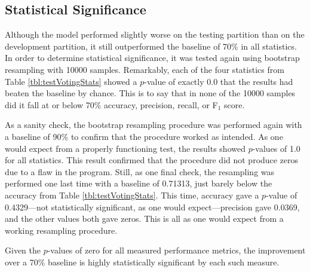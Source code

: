 \documentclass{article}
\begin{document}
\subsection*{Statistical Significance}

Although the model performed slightly worse on the testing partition than on the development partition, it still outperformed the baseline of 70\% in all statistics. In order to determine statistical significance, it was tested again using bootstrap resampling with 10000 samples. Remarkably, each of the four statistics from Table \ref{tbl:testVotingStats} showed a $p$-value of exactly 0.0 that the results had beaten the baseline by chance. This is to say that in none of the 10000 samples did it fall at or below 70\% accuracy, precision, recall, or F$_1$ score.

As a sanity check, the bootstrap resampling procedure was performed again with a baseline of 90\% to confirm that the procedure worked as intended. As one would expect from a properly functioning test, the results showed $p$-values of 1.0 for all statistics. This result confirmed that the procedure did not produce zeros due to a flaw in the program. Still, as one final check, the resampling was performed one last time with a baseline of 0.71313, just barely below the accuracy from Table \ref{tbl:testVotingStats}. This time, accuracy gave a $p$-value of 0.4329---not statistically significant, as one would expect---precision gave 0.0369, and the other values both gave zeros. This is all as one would expect from a working resampling procedure.

Given the $p$-values of zero for all measured performance metrics, the improvement over a 70\% baseline is highly statistically significant by each such measure.
\end{document}
